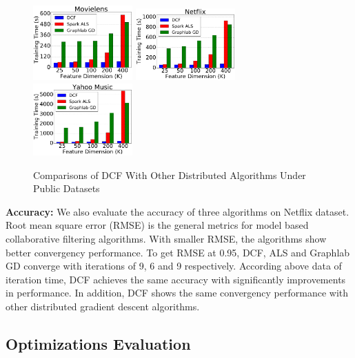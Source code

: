 \documentclass{llncs}
\begin{document}
\begin{figure}[!t]
\centering
\includegraphics[width=1.5in]{pics/movielens.pdf}
\includegraphics[width=1.5in]{pics/netflix.pdf}
\includegraphics[width=1.5in]{pics/yahoo.pdf}
\caption{Comparisons of DCF With Other Distributed Algorithms Under Public Datasets}
\vspace{-15pt}
\label{fig:dcfPerformance}
\end{figure}

\textbf{Accuracy:} We also evaluate the accuracy of three algorithms on Netflix dataset. Root mean square error (RMSE) \cite{towards} is the general metrics for model based collaborative filtering algorithms. With smaller RMSE, the algorithms show better convergency performance. To get RMSE at 0.95, DCF, ALS and Graphlab GD converge with iterations of 9, 6 and 9 respectively. According above data of iteration time, DCF achieves the same accuracy with significantly improvements in performance. In addition, DCF shows the same convergency performance with other distributed gradient descent algorithms.


\vspace{-10pt}
\subsection{Optimizations Evaluation}
\vspace{-5pt}
\label{sub:opt}
\end{document}
